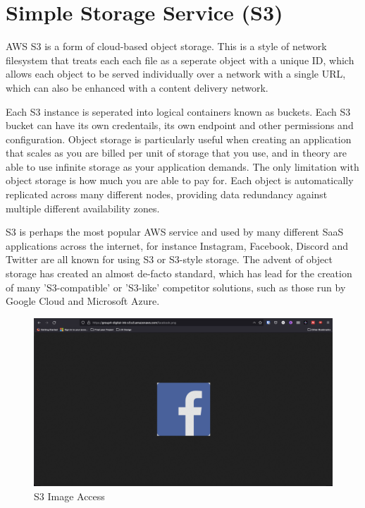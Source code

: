 \chapter{Simple Storage Service (S3)}\label{ch:simple-storage-service}

AWS S3 is a form of cloud-based object storage.
This is a style of network filesystem that treats each each file as a seperate object with a unique ID, which allows each object to be served individually over a network with a single URL, which can also be enhanced with a content delivery network.

Each S3 instance is seperated into logical containers known as buckets. Each S3 bucket can have its own credentails, its own endpoint and other permissions and configuration. Object storage is particularly useful when creating an application that scales as you are billed per unit of storage that you use, and in theory are able to use infinite storage as your application demands. The only limitation with object storage is how much you are able to pay for. Each object is automatically replicated across many different nodes, providing data redundancy against multiple different availability zones.

S3 is perhaps the most popular AWS service and used by many different SaaS applications across the internet, for instance Instagram, Facebook, Discord and Twitter are all known for using S3 or S3-style storage. The advent of object storage has created an almost de-facto standard, which has lead for the creation of many 'S3-compatible' or 'S3-like' competitor solutions, such as those run by Google Cloud and Microsoft Azure.

\begin{figure}[!htbp]
    \centering
    \includegraphics[width=\textwidth]{resources/s3/s3-image-displayed.png}
    \caption{S3 Image Access}
    \label{fig:s3-image}
\end{figure}